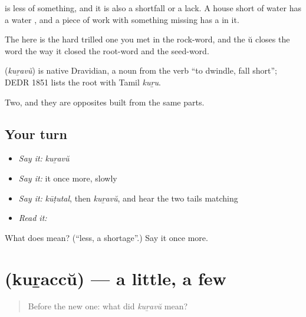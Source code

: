  is less of something, and it is also a shortfall or a lack. A house short of water has a water , and a piece of work with something missing has a  in it.

The  here is the hard trilled one you met in the rock-word, and the ŭ closes the word the way it closed the root-word and the seed-word.

\begin{cousinweb}
\textbf{} (\emph{kuṟavŭ}) is native Dravidian, a noun from the verb \textquotedblleft{}to dwindle, fall short\textquotedblright{}; DEDR 1851 lists the root with Tamil \emph{kuṟu}.
\end{cousinweb}

\begin{grammarlens}[title={What you've built}]
Two, and they are opposites built from the same parts.
\end{grammarlens}

\subsection*{Your turn}
\begin{itemize}
\raggedright
  \item \emph{Say it:} \emph{kuṟavŭ}
  \item \emph{Say it:} it once more, slowly
  \item \emph{Say it:} \emph{kūṭutal}, then \emph{kuṟavŭ}, and hear the two tails matching
  \item \emph{Read it:} \textbf{}
\end{itemize}

\begin{tcolorbox}[breakable,colback=teal!4,colframe=teal!35!black,title={Before you move on}]
What does  mean? (\textquotedblleft{}less, a shortage\textquotedblright{}.) Say it once more.
\end{tcolorbox}
\section[\texorpdfstring{\ml{കുറച്ച്} (kuṟaccŭ)}{കുറച്ച് (kuṟaccŭ)}]{ (kuṟaccŭ) — a little, a few}

\label{lesson:ML-C58-a-little}



\begin{quote}
Before the new one: what did \emph{kuṟavŭ} mean?
\end{quote}

